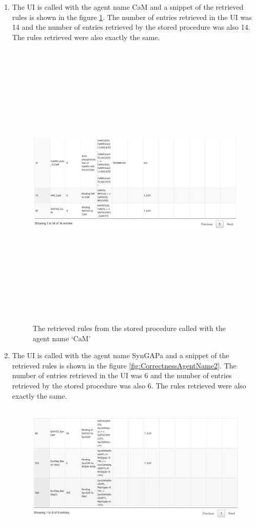 \documentclass[msc,deptreport,ai]{infthesis}      %
\begin{document}
\begin{enumerate}
	\item The UI is called with the agent name CaM and a snippet of the retrieved rules is shown in the figure \ref{fig:CorrectnessAgentName1}. The number of entries retrieved in the UI was 14 and the number of entries retrieved by the stored procedure was also 14. The rules retrieved were also exactly the same.
	\begin{figure}[H]
		\centering
		\captionsetup{justification=centering}
		\includegraphics[width=\linewidth,height=14cm,keepaspectratio]{CorrectnessAgentName1.png}	
		\caption{The retrieved rules from the stored procedure called with the agent name `CaM'}
		\label{fig:CorrectnessAgentName1}		
	\end{figure}
	\item The UI is called with the agent name SynGAPa and a snippet of the retrieved rules is shown in the figure \ref{fig:CorrectnessAgentName2}. The number of entries retrieved in the UI was 6 and the number of entries retrieved by the stored procedure was also 6. The rules retrieved were also exactly the same.
	\begin{figure}[H]
		\centering
		\captionsetup{justification=centering}
		\includegraphics[width=\linewidth,height=6.5cm,keepaspectratio]{CorrectnessAgentName2.png}	

\end{figure}
\end{enumerate}
\end{document}
